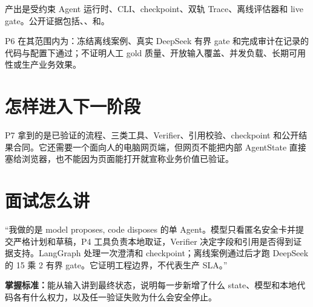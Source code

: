 产出是受约束 Agent 运行时、CLI、checkpoint、双轨 Trace、离线评估器和 live gate。公开证据包括、、和。

P6 在其范围内为\statuspassed：冻结离线案例、真实 DeepSeek 有界 gate 和完成审计在记录的代码与配置下通过；不证明人工 gold 质量、开放输入覆盖、并发负载、长期可用性或生产业务效果。

\section{怎样进入下一阶段}

P7 拿到的是已验证的流程、三类工具、Verifier、引用校验、checkpoint 和公开结果合同。它还需要一个面向人的电脑网页端，但网页不能把内部 AgentState 直接塞给浏览器，也不能因为页面能打开就宣称业务价值已验证。

\section{面试怎么讲}

\begin{interviewbox}
“我做的是 model proposes, code disposes 的单 Agent。模型只看匿名安全卡并提交严格计划和草稿，P4 工具负责本地取证，Verifier 决定字段和引用是否得到证据支持。LangGraph 处理一次澄清和 checkpoint；离线案例通过后才跑 DeepSeek 的 15 乘 2 有界 gate。它证明工程边界，不代表生产 SLA。”
\end{interviewbox}

\textbf{掌握标准：}能从输入讲到最终状态，说明每一步新增了什么 state、模型和本地代码各有什么权力，以及任一验证失败为什么会安全停止。
